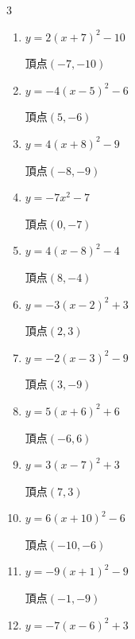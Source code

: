 \begin{multicols}{3}
\begin{enumerate}
        $\displaystyle 頂点\left( 7 , 3 \right)$

  \item $\displaystyle y=2\left( x+7\right)^{2}-10$

        $\displaystyle 頂点\left( -7 , -10 \right)$

  \item $\displaystyle y=-4\left( x-5\right)^{2}-6$

        $\displaystyle 頂点\left( 5 , -6 \right)$

  \item $\displaystyle y=4\left( x+8\right)^{2}-9$

        $\displaystyle 頂点\left( -8 , -9 \right)$

  \item $\displaystyle y=-7x^{2}-7$

        $\displaystyle 頂点\left( 0 , -7 \right)$

\columnbreak %

  \item $\displaystyle y=4\left( x-8\right)^{2}-4$

        $\displaystyle 頂点\left( 8 , -4 \right)$

  \item $\displaystyle y=-3\left( x-2\right)^{2}+3$

        $\displaystyle 頂点\left( 2 , 3 \right)$

  \item $\displaystyle y=-2\left( x-3\right)^{2}-9$

        $\displaystyle 頂点\left( 3 , -9 \right)$

  \item $\displaystyle y=5\left( x+6\right)^{2}+6$

        $\displaystyle 頂点\left( -6 , 6 \right)$

  \item $\displaystyle y=3\left( x-7\right)^{2}+3$

        $\displaystyle 頂点\left( 7 , 3 \right)$

  \item $\displaystyle y=6\left( x+10\right)^{2}-6$

        $\displaystyle 頂点\left( -10 , -6 \right)$

  \item $\displaystyle y=-9\left( x+1\right)^{2}-9$

        $\displaystyle 頂点\left( -1 , -9 \right)$

  \item $\displaystyle y=-7\left( x-6\right)^{2}+3$


\end{enumerate}
\end{multicols}

